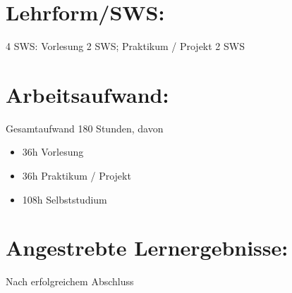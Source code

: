 \section*{Lehrform/SWS:\label{/mi-2017/modulbeschreibungen-master/MA_VC_Modul_BildbasierteComputergrafik}}\label{lehrformswspathlabelmi-2017modulbeschreibungen-mastermaux5fvcux5fmodulux5fbildbasiertecomputergrafik}

4 SWS: Vorlesung 2 SWS; Praktikum / Projekt 2 SWS

\section*{Arbeitsaufwand:\label{/mi-2017/modulbeschreibungen-master/MA_VC_Modul_BildbasierteComputergrafik}}\label{arbeitsaufwandpathlabelmi-2017modulbeschreibungen-mastermaux5fvcux5fmodulux5fbildbasiertecomputergrafik}

Gesamtaufwand 180 Stunden, davon

\begin{itemize}
\tightlist
\item
  36h Vorlesung
\item
  36h Praktikum / Projekt
\item
  108h Selbststudium
\end{itemize}

\section*{Angestrebte
Lernergebnisse:\label{/mi-2017/modulbeschreibungen-master/MA_VC_Modul_BildbasierteComputergrafik}}\label{angestrebte-lernergebnissepathlabelmi-2017modulbeschreibungen-mastermaux5fvcux5fmodulux5fbildbasiertecomputergrafik}

Nach erfolgreichem Abschluss

